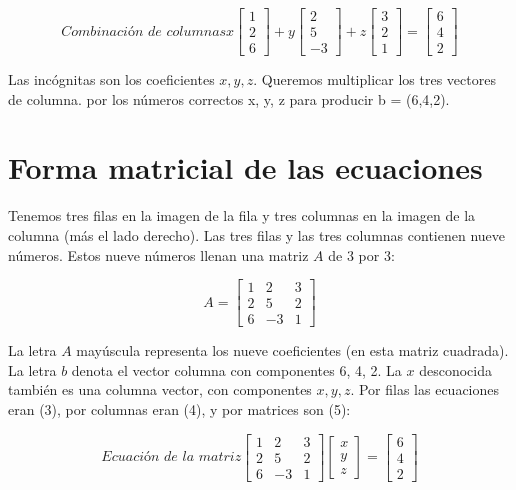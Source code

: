 \begin{equation*}
	\textit{Combinación de columnas} x\begin{bmatrix} 1\\2\\6 \end{bmatrix} +y\begin{bmatrix} 2\\5\\-3 \end{bmatrix}+z\begin{bmatrix} 3\\2\\1 \end{bmatrix}=\begin{bmatrix} 6\\4\\2 \end{bmatrix}
\end{equation*}

Las incógnitas son los coeficientes $x, y, z$. Queremos multiplicar los tres vectores de columna.
por los números correctos x, y, z para producir b = (6,4,2).


\section{Forma matricial de las ecuaciones}
Tenemos tres filas en la imagen de la fila y tres columnas en la imagen de la columna (más el
lado derecho). Las tres filas y las tres columnas contienen nueve números. Estos nueve números
llenan una matriz $A$ de 3 por 3:

\begin{equation*}
	A= \begin{bmatrix} 1&2&3\\2&5&2\\6&-3&1 \end{bmatrix}
\end{equation*}

La letra $A$ mayúscula representa los nueve coeficientes (en esta matriz cuadrada). La letra
$b$ denota el vector columna con componentes 6, 4, 2. La $x$ desconocida también es una columna
vector, con componentes $x, y, z$.  Por filas las ecuaciones eran (3), por columnas eran (4), y por matrices son (5):

\begin{equation*}
	\textit{Ecuación de la matriz} \begin{bmatrix} 1&2&3\\2&5&2\\6&-3&1 \end{bmatrix} \begin{bmatrix} x\\y\\z \end{bmatrix} = \begin{bmatrix} 6\\4\\2 \end{bmatrix}
\end{equation*}

